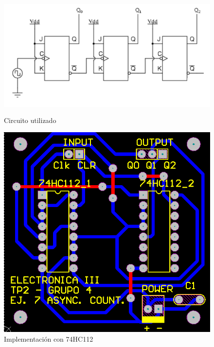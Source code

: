 \begin{figure}[H]
\begin{center}
  \begin{minipage}[b]{0.4\textwidth}
  	\begin{center}
  		\includegraphics[scale=0.25]{ejercicio7/imagenes/asynccircuito.png}
  	\end{center}
  \caption{Circuito utilizado}
  \label{7_fig1}
  \end{minipage}
  \begin{minipage}[b]{0.4\textwidth}
    \begin{center}
  		\includegraphics[scale=0.25]{ejercicio7/imagenes/asyncaltium.png}
	\end{center}
  \caption{Implementación con 74HC112}
  \label{7_fig2}
 \end{minipage}
\end{center}
\end{figure}


